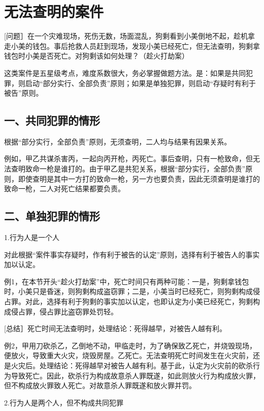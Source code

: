 \section{无法查明的案件}

[问题］在一个灾难现场，死伤无数，场面混乱，狗剩看到小美倒地不起，趁机拿走小美的钱包。事后抢救人员赶到现场，发现小美已经死亡，但无法查明，狗剩拿钱包时小美是否死亡。对狗剩该如何处理？（趁火打劫案）

这类案件是五星级考点，难度系数很大，务必掌握做题方法。是：如果是共同犯罪，则启动“部分实行、全部负责”原则；如果是单独犯罪，则启动“存疑时有利于被告”原则。

\subsection*{一、共同犯罪的情形}

根据“部分实行，全部负责”原则，无须查明，二人均与结果有因果关系。

例如，甲乙共谋杀害丙，一起向丙开枪，丙死亡。事后查明，只有一枪致命，但无法查明致命一枪是谁打的。由于甲乙是共犯关系，根据“部分实行，全部负责”原则，即使查明是其中一方打的致命一枪，另一方也要负责，因此无须查明是谁打的致命一枪，二人对死亡结果都要负责。

\subsection*{二、单独犯罪的情形}

1.行为人是一个人

对此根据“案件事实存疑时，作有利于被告的认定”原则，选择有利于被告人的事实加以认定。

例1，在本节开头“趁火打劫案”中，死亡时间只有两种可能：一是，狗剩拿钱包时，小美只是昏迷，则狗剩构成盗窃罪；二是，小美当时已经死亡，则狗剩构成侵占罪。对此，选择有利于狗剩的事实加以认定，也即认定为小美已经死亡，狗剩构成侵占罪，侵占罪比盗窃罪处罚轻。

[总结］死亡时间无法查明时，处理结论：死得越早，对被告人越有利。

例2，甲用刀砍杀乙，乙倒地不动，甲临走时，为了确保致乙死亡，并烧毁现场，便放火，导致重大火灾，烧毁房屋。乙死亡。无法查明死亡时间发生在火灾前，还是火灾后。处理结论：死得越早对被告人越有利。基于此，认定为火灾前的砍杀行为导致死亡。因此，砍杀行为构成故意杀人罪既遂，如此则放火行为构成放火罪，但不构成放火罪致人死亡。对故意杀人罪既遂和放火罪并罚。

2.行为人是两个人，但不构成共同犯罪

